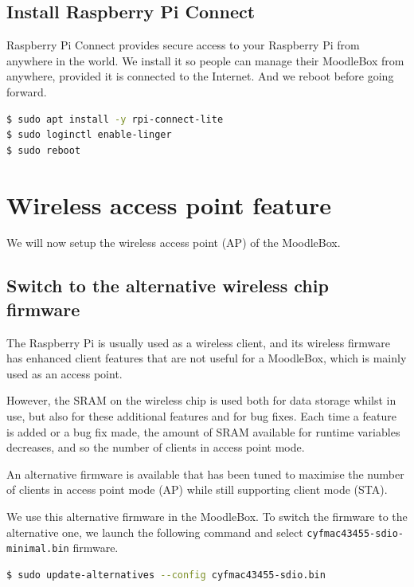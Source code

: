 \documentclass[12pt]{article}
\begin{document}
\subsection{Install Raspberry Pi Connect}

Raspberry Pi Connect provides secure access to your Raspberry Pi from anywhere in the world.
We install it so people can manage their MoodleBox from anywhere, provided it is connected to the Internet.
And we reboot before going forward.

\begin{lstlisting}[language=bash]
$ sudo apt install -y rpi-connect-lite
$ sudo loginctl enable-linger
$ sudo reboot
\end{lstlisting}

\section{Wireless access point feature}

We will now setup the wireless access point (AP) of the MoodleBox.

\subsection{Switch to the alternative wireless chip firmware}

The Raspberry Pi is usually used as a wireless client, and its wireless firmware has enhanced client features that are not useful for a MoodleBox, which is mainly used as an access point.

However, the SRAM on the wireless chip is used both for data storage whilst in use, but also for these additional features and for bug fixes.
Each time a feature is added or a bug fix made, the amount of SRAM available for runtime variables decreases, and so the number of clients in access point mode.

An alternative firmware is available that has been tuned to maximise the number of clients in access point mode (AP) while still supporting client mode (STA).

We use this alternative firmware in the MoodleBox.
To switch the firmware to the alternative one, we launch the following command and select \lstinline{cyfmac43455-sdio-minimal.bin} firmware.

\begin{lstlisting}[language=bash]
$ sudo update-alternatives --config cyfmac43455-sdio.bin
\end{lstlisting}
\end{document}
